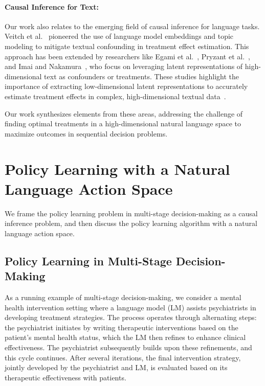 \documentclass{article}
\begin{document}
\paragraph{Causal Inference for Text: } 
Our work also relates to the emerging field of causal inference for language tasks. Veitch et al.~\cite{veitch2020adapting} pioneered the use of language model embeddings and topic modeling to mitigate textual confounding in treatment effect estimation. This approach has been extended by researchers like Egami et al.~\cite{egami2022make}, Pryzant et al.~\cite{pryzant2020causal}, and Imai and Nakamura~\cite{imai2024causal}, who focus on leveraging latent representations of high-dimensional text as confounders or treatments. These studies highlight the importance of extracting low-dimensional latent representations to accurately estimate treatment effects in complex, high-dimensional textual data~\cite{louizos2017causal,kim2021counterfactual,zhang2024causal,wang2021desiderata}.

Our work synthesizes elements from these areas, addressing the challenge of finding optimal treatments in a high-dimensional natural language space to maximize outcomes in sequential decision problems.

\section{Policy Learning with a Natural Language Action Space}

We frame the policy learning problem in multi-stage decision-making as
a causal inference problem, and then discuss the policy learning algorithm
with a natural language action space.

\subsection{Policy Learning in Multi-Stage Decision-Making}
As a running example of multi-stage decision-making, we consider a mental health intervention setting where a language model (LM) assists psychiatrists in developing treatment strategies. The process operates through alternating steps: the psychiatrist initiates by writing therapeutic interventions based on the patient's mental health status, which the LM then refines to enhance clinical effectiveness. The psychiatrist subsequently builds upon these refinements, and this cycle continues. After several iterations, the final intervention strategy, jointly developed by the psychiatrist and LM, is evaluated based on its therapeutic effectiveness with patients.
\end{document}
